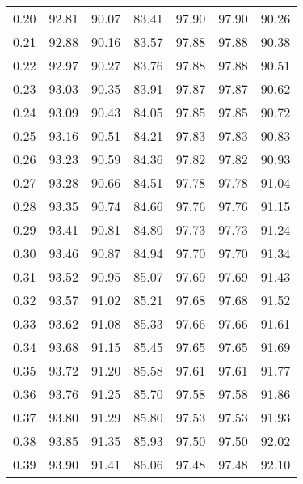 \begin{tabular}{|c|c|c|c|c|c|c|}
      0.20 &     92.81 &     90.07 &      83.41 &   97.90 &      97.90 &         90.26 \\
      0.21 &     92.88 &     90.16 &      83.57 &   97.88 &      97.88 &         90.38 \\
      0.22 &     92.97 &     90.27 &      83.76 &   97.88 &      97.88 &         90.51 \\
      0.23 &     93.03 &     90.35 &      83.91 &   97.87 &      97.87 &         90.62 \\
      0.24 &     93.09 &     90.43 &      84.05 &   97.85 &      97.85 &         90.72 \\
      0.25 &     93.16 &     90.51 &      84.21 &   97.83 &      97.83 &         90.83 \\
      0.26 &     93.23 &     90.59 &      84.36 &   97.82 &      97.82 &         90.93 \\
      0.27 &     93.28 &     90.66 &      84.51 &   97.78 &      97.78 &         91.04 \\
      0.28 &     93.35 &     90.74 &      84.66 &   97.76 &      97.76 &         91.15 \\
      0.29 &     93.41 &     90.81 &      84.80 &   97.73 &      97.73 &         91.24 \\
      0.30 &     93.46 &     90.87 &      84.94 &   97.70 &      97.70 &         91.34 \\
      0.31 &     93.52 &     90.95 &      85.07 &   97.69 &      97.69 &         91.43 \\
      0.32 &     93.57 &     91.02 &      85.21 &   97.68 &      97.68 &         91.52 \\
      0.33 &     93.62 &     91.08 &      85.33 &   97.66 &      97.66 &         91.61 \\
      0.34 &     93.68 &     91.15 &      85.45 &   97.65 &      97.65 &         91.69 \\
      0.35 &     93.72 &     91.20 &      85.58 &   97.61 &      97.61 &         91.77 \\
      0.36 &     93.76 &     91.25 &      85.70 &   97.58 &      97.58 &         91.86 \\
      0.37 &     93.80 &     91.29 &      85.80 &   97.53 &      97.53 &         91.93 \\
      0.38 &     93.85 &     91.35 &      85.93 &   97.50 &      97.50 &         92.02 \\
      0.39 &     93.90 &     91.41 &      86.06 &   97.48 &      97.48 &         92.10 \\

\end{tabular}
